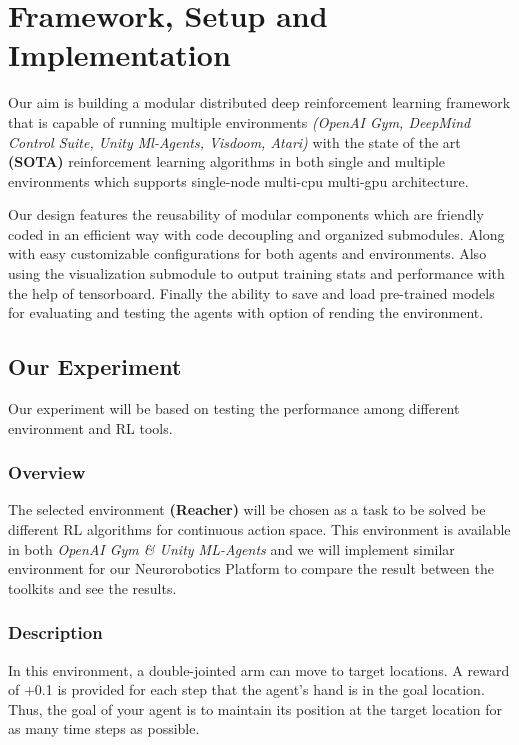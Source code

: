 
\chapter{Framework, Setup and Implementation}\label{chapter:Setup and Implementation}

Our aim is building a modular distributed deep reinforcement learning framework that is capable of running multiple environments \textit{(OpenAI Gym, DeepMind Control Suite, Unity Ml-Agents, Visdoom, Atari)} with the state of the art \textbf{(SOTA)} reinforcement learning algorithms in both single and multiple environments which supports single-node multi-cpu multi-gpu architecture.

Our design features the reusability of modular components which are friendly coded in an efficient way with code decoupling and organized submodules.
Along with easy customizable configurations for both agents and environments. Also using the visualization submodule to output training stats and performance with the help of tensorboard. Finally the ability to save and load pre-trained models for evaluating and testing the agents with option of rending the environment.


\section{Our Experiment}
Our experiment will be based on testing the performance among different environment and RL tools.

\subsection{Overview} 

The selected environment \textbf{(Reacher)} will be chosen as a task to be solved be different RL algorithms for continuous action space. This environment is available in both \textit{OpenAI Gym \& Unity ML-Agents} and we will implement similar environment for our Neurorobotics Platform to compare the result between the toolkits and see the results.

\subsection{Description}
In this environment, a double-jointed arm can move to target locations. A reward of +0.1 is provided for each step that the agent's hand is in the goal location. Thus, the goal of your agent is to maintain its position at the target location for as many time steps as possible.

